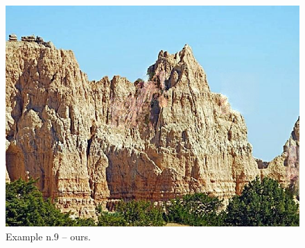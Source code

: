 \documentclass[a4paper, 11pt]{article}
\begin{document}
\begin{figure}
    \centering
    \includegraphics[width=.95\linewidth]{documentation/img/modified/0090.png}
    \caption{Example n.9 -- ours.}
    \label{img:ex_n.9_mask}
\end{figure}
\end{document}
